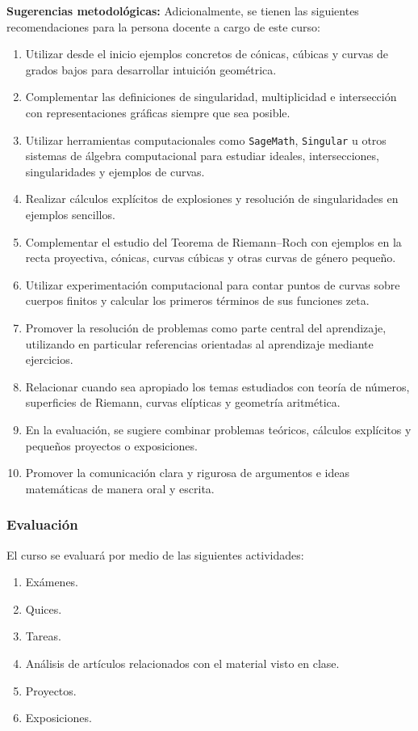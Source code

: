 \begin{refsection}
\textbf{Sugerencias metodológicas:} Adicionalmente, se tienen las siguientes recomendaciones para la persona docente a cargo de este curso:
\begin{enumerate}
\item Utilizar desde el inicio ejemplos concretos de cónicas, cúbicas y curvas de grados bajos para desarrollar intuición geométrica.
\item Complementar las definiciones de singularidad, multiplicidad e intersección con representaciones gráficas siempre que sea posible.
\item Utilizar herramientas computacionales como \texttt{SageMath}, \texttt{Singular} u otros sistemas de álgebra computacional para estudiar ideales, intersecciones, singularidades y ejemplos de curvas.
\item Realizar cálculos explícitos de explosiones y resolución de singularidades en ejemplos sencillos.
\item Complementar el estudio del Teorema de Riemann--Roch con ejemplos en la recta proyectiva, cónicas, curvas cúbicas y otras curvas de género pequeño.
\item Utilizar experimentación computacional para contar puntos de curvas sobre cuerpos finitos y calcular los primeros términos de sus funciones zeta.
\item Promover la resolución de problemas como parte central del aprendizaje, utilizando en particular referencias orientadas al aprendizaje mediante ejercicios.
\item Relacionar cuando sea apropiado los temas estudiados con teoría de números, superficies de Riemann, curvas elípticas y geometría aritmética.
\item En la evaluación, se sugiere combinar problemas teóricos, cálculos explícitos y pequeños proyectos o exposiciones.
\item Promover la comunicación clara y rigurosa de argumentos e ideas matemáticas de manera oral y escrita.
\end{enumerate}

\subsubsection*{Evaluación}

El curso se evaluará por medio de las siguientes actividades:

\begin{enumerate}
\item Exámenes.
\item Quices.
\item Tareas.
\item Análisis de artículos relacionados con el material visto en clase.
\item Proyectos.
\item Exposiciones.
\end{enumerate}


\end{refsection}

